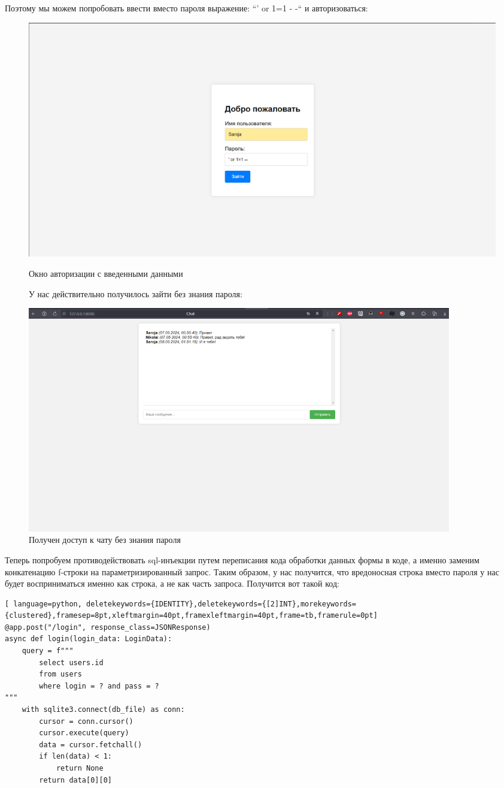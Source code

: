 \documentclass[a4paper,12pt]{diplom}
\begin{document}
	 Поэтому мы можем попробовать ввести вместо пароля выражение: ``' or 1=1 - -`` и авторизоваться:
	 
	 \begin{figure}[!ht]
	 {\centering
	 \includegraphics[width=1\textwidth]{auth_sql_injection_attack.png}
	 \caption{Окно авторизации с введенными данными}\par\medskip
	 \label{fig:auth_sql_injection_attack} 
	 }
	 У нас действительно получилось зайти без знания пароля:\par\bigskip
	 {\centering
	 \includegraphics[width=0.9\textwidth]{chat_sql_injection_attack_success.png}
	 \caption{Получен доступ к чату без знания пароля}
	 \label{fig:chat_sql_injection_attack_success}
	 }
	 \end{figure}
	 
	 Теперь попробуем противодействовать sql-инъекции путем переписания кода обработки данных формы в коде, а именно заменим конкатенацию f-строки на параметризированный запрос. Таким образом, у нас получится, что вредоносная строка вместо пароля у нас будет восприниматься именно как строка, а не как часть запроса. Получится вот такой код:
	 
	 \begin{lstlisting}[ language=python, deletekeywords={IDENTITY},deletekeywords={[2]INT},morekeywords={clustered},framesep=8pt,xleftmargin=40pt,framexleftmargin=40pt,frame=tb,framerule=0pt]    
@app.post("/login", response_class=JSONResponse)
async def login(login_data: LoginData):
	query = f"""
	 	select users.id
	 	from users
	 	where login = ? and pass = ?
"""
	with sqlite3.connect(db_file) as conn:
		cursor = conn.cursor()
	 	cursor.execute(query)
	 	data = cursor.fetchall()
	 	if len(data) < 1:
	 		return None
	 	return data[0][0]
	 \end{lstlisting}
	 
\end{document}
